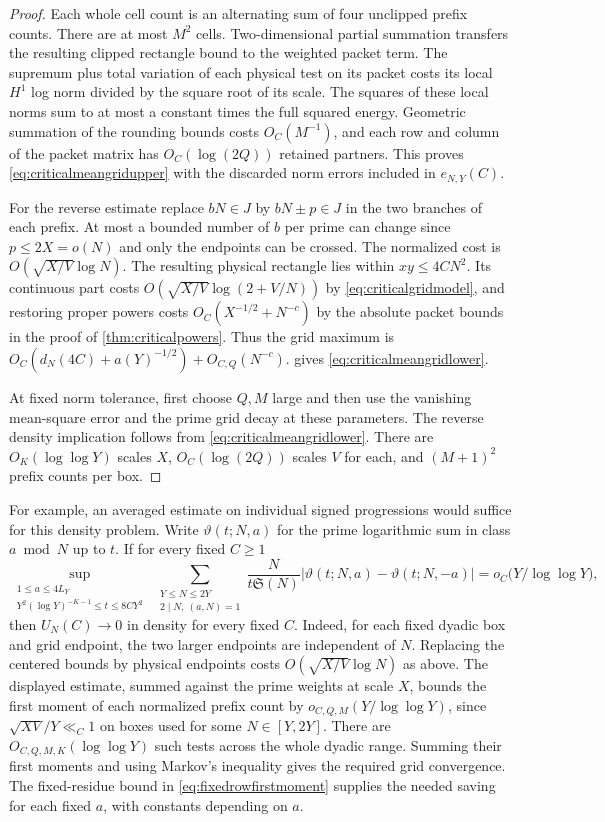 \documentclass[11pt,a4paper]{article}
\numberwithin{equation}{section}
\newcommand{\SSS}{\mathfrak S}
\begin{document}
\begin{proof}
Each whole cell count is an alternating sum of four
unclipped prefix counts. There are at most $M^2$ cells.
Two-dimensional partial summation transfers the resulting
clipped rectangle bound to the weighted packet term.
The supremum plus total variation of each physical
test on its packet costs its local $H^1$ log norm
divided by the square root of its scale. The squares
of these local norms sum to at most a constant times
the full squared energy. Geometric summation of the
rounding bounds costs $O_C(M^{-1})$, and each row and
column of the packet matrix has $O_C(\log(2Q))$ retained
partners. This proves \cref{eq:criticalmeangridupper}
with the discarded norm errors included in $e_{N,Y}(C)$.

For the reverse estimate replace $bN\in J$ by
$bN\pm p\in J$ in the two branches of each prefix.
At most a bounded number of $b$ per prime can change
since $p\le2X=o(N)$ and only the endpoints can be
crossed. The normalized cost is
$O(\sqrt{X/V}\log N)$. The resulting physical rectangle
lies within $xy\le4CN^2$. Its continuous part costs
$O(\sqrt{X/V}\log(2+V/N))$ by \cref{eq:criticalgridmodel},
and restoring proper powers costs $O_C(X^{-1/2}+N^{-c})$
by the absolute packet bounds in the proof of
\cref{thm:criticalpowers}. Thus the grid maximum is
$O_C(d_N(4C)+a(Y)^{-1/2})+O_{C,Q}(N^{-c})$.
 gives
\cref{eq:criticalmeangridlower}.

At fixed norm tolerance, first choose $Q,M$ large and
then use the vanishing mean-square error and the prime
grid decay at these parameters. The reverse density
implication follows from \cref{eq:criticalmeangridlower}.
There are $O_K(\log\log Y)$ scales $X$,
$O_C(\log(2Q))$ scales $V$ for each, and $(M+1)^2$
prefix counts per box.
\end{proof}

For example, an averaged estimate on individual signed
progressions would suffice for this density problem.
Write $\vartheta(t;N,a)$ for the prime logarithmic sum
in class $a\bmod N$ up to $t$. If for every fixed $C\ge1$
\[
 \sup_{\substack{1\le a\le 4L_Y\\
                Y^2(\log Y)^{-K-1}\le t\le8CY^2}}
 \ \sum_{\substack{Y\le N\le2Y\\2\mid N,\ (a,N)=1}}
 \frac{N}{t\SSS(N)}
       |\vartheta(t;N,a)-\vartheta(t;N,-a)|
     = o_C\bigl(Y/\log\log Y\bigr),
\]
then $U_N(C)\to0$ in density for every fixed $C$.
Indeed, for each fixed dyadic box and grid endpoint,
the two larger endpoints are independent of $N$.
Replacing the centered bounds by physical endpoints
costs $O(\sqrt{X/V}\log N)$ as above. The displayed
estimate, summed against the prime weights at scale $X$,
bounds the first moment of each normalized prefix
count by $o_{C,Q,M}(Y/\log\log Y)$, since
$\sqrt{XV}/Y\ll_C1$ on boxes used for some $N\in[Y,2Y]$.
There are $O_{C,Q,M,K}(\log\log Y)$ such tests across
the whole dyadic range. Summing their first moments
and using Markov's inequality gives the required
grid convergence. The fixed-residue bound in
\cref{eq:fixedrowfirstmoment} supplies the needed
saving for each fixed $a$, with constants depending
on $a$.
\end{document}
